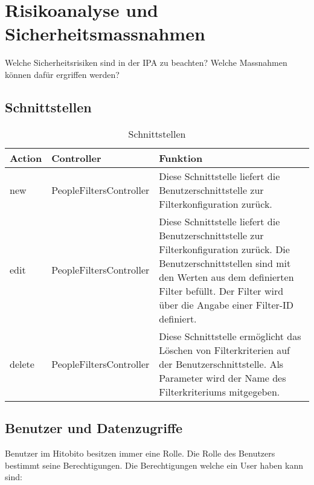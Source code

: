 \chapter{Risikoanalyse und Sicherheitsmassnahmen}
Welche Sicherheitsrisiken sind in der IPA zu beachten? Welche Massnahmen können dafür ergriffen werden?

\section{Schnittstellen}

\begin{table}[h!]
  \begin{tabular}{|L{0.2\textwidth}|L{0.3\textwidth}|L{0.4\textwidth}|}
      \color{white} Action & \color{white} Controller & \color{white} Funktion \\ [12pt]
      \hline
      new & PeopleFiltersController & Diese Schnittstelle liefert die Benutzerschnittstelle zur Filterkonfiguration zurück.  \\
      \hline 
      edit & PeopleFiltersController & Diese Schnittstelle liefert die Benutzerschnittstelle zur Filterkonfiguration zurück. Die Benutzerschnittstellen
      sind mit den Werten aus dem definierten Filter befüllt. Der Filter wird über die Angabe einer Filter-ID definiert.  \\
      \hline 
      delete & PeopleFiltersController & Diese Schnittstelle ermöglicht das Löschen von Filterkriterien auf der Benutzerschnittstelle. Als Parameter
      wird der Name des Filterkriteriums mitgegeben.   \\
      \hline 
    \end{tabular}
    \caption{Schnittstellen}
\end{table}

\newpage

\section{Benutzer und Datenzugriffe}
Benutzer im Hitobito besitzen immer eine Rolle. Die Rolle des Benutzers bestimmt seine Berechtigungen. Die Berechtigungen welche ein User haben kann sind:

